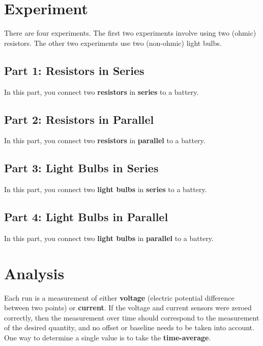 \section{Experiment}
There are four experiments. The first two experiments involve using two (ohmic) resistors. The other two experiments use two (non-ohmic) light bulbs.
\subsection{Part 1: Resistors in Series}
In this part, you connect two \textbf{resistors} in \textbf{series} to a battery.
\subsection{Part 2: Resistors in Parallel}
In this part, you connect two \textbf{resistors} in \textbf{parallel} to a battery.
\subsection{Part 3: Light Bulbs in Series}
In this part, you connect two \textbf{light bulbs} in \textbf{series} to a battery.
\subsection{Part 4: Light Bulbs in Parallel}
In this part, you connect two \textbf{light bulbs} in \textbf{parallel} to a battery.
\section{Analysis}
Each run is a measurement of either \textbf{voltage} (electric potential difference between two points) or \textbf{current}. If the voltage and current sensors were zeroed correctly, then the measurement over time should correspond to the measurement of the desired quantity, and no offset or baseline needs to be taken into account. One way to determine a single value is to take the \textbf{time-average}.

